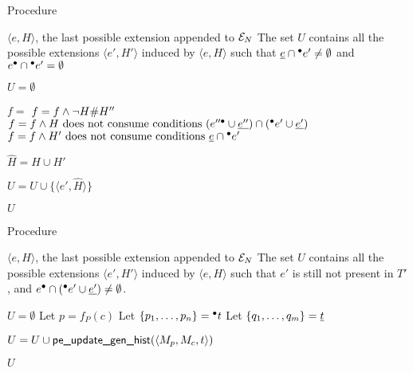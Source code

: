 \begin{algorithm}
\caption{Procedure \peupdatecont}
\label{alg:pe.updatecont}

\begin{algorithmic}
\REQUIRE $\langle e, H \rangle$, the last possible extension appended to $\mathcal{E}_{N}$
\ENSURE The set $U$ contains all the possible extensions $\langle e', H'
\rangle$ induced by $\langle e, H \rangle$ such that $\underline{e}
\cap {}^\bullet e' \neq \emptyset$ and $e^\bullet \cap {}^\bullet e' = \emptyset$

\STATE $U = \emptyset$

\STATE $f = $ \TRUE
{}
\STATE $f = f \land \lnot H \mathord{\#} H''$
\STATE $f = f \land H \mbox{ does not consume conditions } (e''^\bullet \cup
\underline{e''}) \cap ({}^\bullet e' \cup \underline{e'})$
\STATE $f = f \land H' \mbox{ does not consume conditions } \underline{e} \cap
{}^\bullet e'$
\ENDFOR

\STATE $\widehat H = H \cup H'$

\STATE $U = U \cup \{\langle e', \widehat H \rangle\}$
\ENDIF
\ENDFOR
\ENDFOR

\RETURN $U$

\end{algorithmic}
\end{algorithm}

\begin{algorithm}
\caption{Procedure \peupdatenew}
\label{alg:pe.updatenew}

\begin{algorithmic}
\REQUIRE $\langle e, H \rangle$, the last possible extension appended to $\mathcal{E}_{N}$
\ENSURE The set $U$ contains all the possible extensions $\langle e', H'
\rangle$ induced by $\langle e, H \rangle$ such that $e'$ is still not present
in $T'$, and $e^\bullet \cap ({}^\bullet e' \cup \underline{e'}) \neq \emptyset$.

\STATE $U = \emptyset$
\STATE Let $p = f_P (c)$
\STATE Let $\{p_1, \ldots, p_n\} = {}^\bullet t$
\STATE Let $\{q_1, \ldots, q_m\} = \underline{t}$

\STATE $U = U \cup \mbox{\sf pe\_update\_gen\_hist} (\langle M_p, M_c, t \rangle)$
\ENDIF

\ENDFOR
\ENDFOR
\ENDFOR
\ENDFOR

\RETURN $U$

\end{algorithmic}
\end{algorithm}

